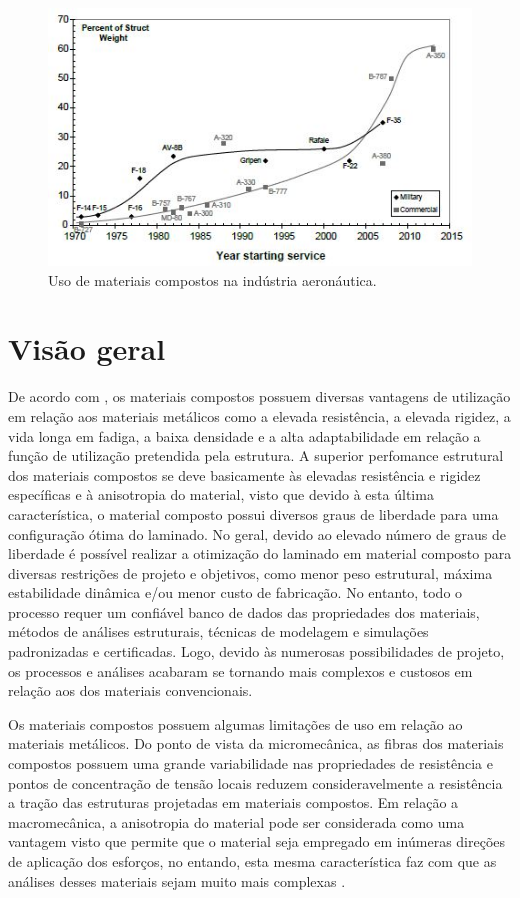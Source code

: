 \begin{figure}[h]
	\caption{\label{fig_usecomposites}Uso de materiais compostos na indústria aeronáutica.}
  \centering
  \includegraphics[scale=1.1]{figura/UseOfComposites}
\end{figure}

\section{Visão geral}
De acordo com \cite{daniel2006engineering}, os materiais compostos possuem diversas vantagens de utilização em relação aos materiais metálicos como a elevada resistência, a elevada rigidez, a vida longa em fadiga, a baixa densidade e a alta adaptabilidade em relação a função de utilização pretendida pela estrutura. A superior perfomance estrutural dos materiais compostos se deve basicamente às elevadas resistência e rigidez específicas e à anisotropia do material, visto que devido à esta última característica, o material composto possui diversos graus de liberdade para uma configuração ótima do laminado. No geral, devido ao elevado número de graus de liberdade é possível realizar a otimização do laminado em material composto para diversas restrições de projeto e objetivos, como menor peso estrutural, máxima estabilidade dinâmica e/ou menor custo de fabricação. No entanto, todo o processo requer um confiável banco de dados das propriedades dos materiais, métodos de análises estruturais, técnicas de modelagem e simulações padronizadas e certificadas. Logo, devido às numerosas possibilidades de projeto, os processos e análises acabaram se tornando mais complexos e custosos em relação aos dos materiais convencionais.

Os materiais compostos possuem algumas limitações de uso em relação ao materiais metálicos. Do ponto de vista da micromecânica, as fibras dos materiais compostos possuem uma grande variabilidade nas propriedades de resistência e pontos de concentração de tensão locais reduzem consideravelmente a resistência a tração das estruturas projetadas em materiais compostos. Em relação a macromecânica, a anisotropia do material pode ser considerada como uma vantagem visto que permite que o material seja empregado em inúmeras direções de aplicação dos esforços, no entando, esta mesma característica faz com que as análises desses materiais sejam muito mais complexas \cite{daniel2006engineering}.

